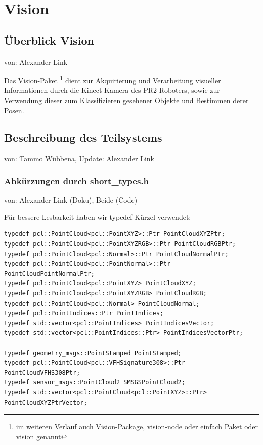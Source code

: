 \documentclass{suturo}
\makeatletter
\newcommand{\chapterauthor}[1]{%
  {\parindent0pt\vspace*{-27pt}%
  \linespread{0}\small\begin{flushright}von: #1\end{flushright}%
  \par\nobreak\vspace*{0pt}}
  \@afterheading%
}
\makeatother
\begin{document}
\section{Vision}

\subsection{Überblick Vision}
\chapterauthor{Alexander Link}
Das Vision-Paket \footnote{im weiteren Verlauf auch Vision-Package, vision-node oder einfach Paket oder vision genannt} dient zur Akquirierung und Verarbeitung visueller Informationen durch die Kinect-Kamera des PR2-Roboters, sowie zur Verwendung dieser zum Klassifizieren gesehener Objekte und Bestimmen derer Posen.

\begin{figure}[!htb]
\end{figure}
      
\subsection{Beschreibung des Teilsystems}
\chapterauthor{Tammo Wübbena, Update: Alexander Link}

\subsubsection{Abkürzungen durch short\_types.h}
\chapterauthor{Alexander Link (Doku), Beide (Code)}
Für bessere Lesbarkeit haben wir typedef Kürzel verwendet:
\begin{verbatim}
typedef pcl::PointCloud<pcl::PointXYZ>::Ptr PointCloudXYZPtr;
typedef pcl::PointCloud<pcl::PointXYZRGB>::Ptr PointCloudRGBPtr;
typedef pcl::PointCloud<pcl::Normal>::Ptr PointCloudNormalPtr;
typedef pcl::PointCloud<pcl::PointNormal>::Ptr PointCloudPointNormalPtr;
typedef pcl::PointCloud<pcl::PointXYZ> PointCloudXYZ;
typedef pcl::PointCloud<pcl::PointXYZRGB> PointCloudRGB;
typedef pcl::PointCloud<pcl::Normal> PointCloudNormal;
typedef pcl::PointIndices::Ptr PointIndices;
typedef std::vector<pcl::PointIndices> PointIndicesVector;
typedef std::vector<pcl::PointIndices::Ptr> PointIndicesVectorPtr;

typedef geometry_msgs::PointStamped PointStamped;
typedef pcl::PointCloud<pcl::VFHSignature308>::Ptr PointCloudVFHS308Ptr;
typedef sensor_msgs::PointCloud2 SMSGSPointCloud2;
typedef std::vector<pcl::PointCloud<pcl::PointXYZ>::Ptr> PointCloudXYZPtrVector;
\end{verbatim}
\end{document}
